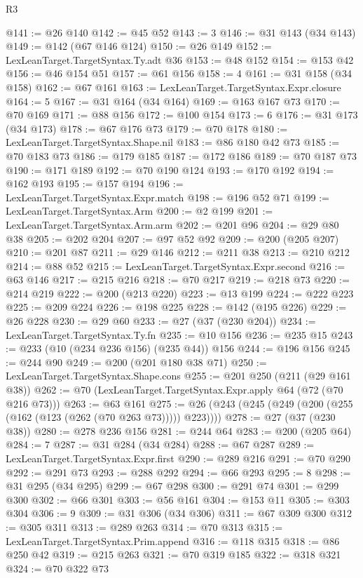 \begin{lexlean}{R3}
\begin{coremodule}
@141 := @26 @140
@142 := @45 @52
@143 := 3
@146 := @31 @143 (@34 @143)
@149 := @142 (@67 @146 @124)
@150 := @26 @149
@152 := LexLeanTarget.TargetSyntax.Ty.adt @36
@153 := @48 @152
@154 := @153 @42
@156 := @46 @154 @51
@157 := @61 @156
@158 := 4
@161 := @31 @158 (@34 @158)
@162 := @67 @161
@163 := LexLeanTarget.TargetSyntax.Expr.closure
@164 := 5
@167 := @31 @164 (@34 @164)
@169 := @163 @167 @73
@170 := @70 @169
@171 := @88 @156
@172 := @100 @154
@173 := 6
@176 := @31 @173 (@34 @173)
@178 := @67 @176 @73
@179 := @70 @178
@180 := LexLeanTarget.TargetSyntax.Shape.nil
@183 := @86 @180 @42 @73
@185 := @70 @183 @73
@186 := @179 @185
@187 := @172 @186
@189 := @70 @187 @73
@190 := @171 @189
@192 := @70 @190 @124
@193 := @170 @192
@194 := @162 @193
@195 := @157 @194
@196 := LexLeanTarget.TargetSyntax.Expr.match
@198 := @196 @52 @71
@199 := LexLeanTarget.TargetSyntax.Arm
@200 := @2 @199
@201 := LexLeanTarget.TargetSyntax.Arm.arm
@202 := @201 @96
@204 := @29 @80 @38
@205 := @202 @204
@207 := @97 @52 @92
@209 := @200 (@205 @207)
@210 := @201 @87
@211 := @29 @146
@212 := @211 @38
@213 := @210 @212
@214 := @88 @52
@215 := LexLeanTarget.TargetSyntax.Expr.second
@216 := @63 @146
@217 := @215 @216
@218 := @70 @217
@219 := @218 @73
@220 := @214 @219
@222 := @200 (@213 @220)
@223 := @13 @199
@224 := @222 @223
@225 := @209 @224
@226 := @198 @225
@228 := @142 (@195 @226)
@229 := @26 @228
@230 := @29 @60
@233 := @27 (@37 (@230 @204))
@234 := LexLeanTarget.TargetSyntax.Ty.fn
@235 := @10 @156
@236 := @235 @15
@243 := @233 (@10 (@234 @236 @156) (@235 @44)) @156
@244 := @196 @156
@245 := @244 @90
@249 := @200 (@201 @180 @38 @71)
@250 := LexLeanTarget.TargetSyntax.Shape.cons
@255 := @201 @250 (@211 (@29 @161 @38))
@262 := @70 (LexLeanTarget.TargetSyntax.Expr.apply @64 (@72 (@70 @216 @73)))
@263 := @63 @161
@275 := @26 (@243 (@245 (@249 (@200 (@255 (@162 (@123 (@262 (@70 @263 @73))))) @223))))
@278 := @27 (@37 (@230 @38))
@280 := @278 @236 @156
@281 := @244 @64
@283 := @200 (@205 @64)
@284 := 7
@287 := @31 @284 (@34 @284)
@288 := @67 @287
@289 := LexLeanTarget.TargetSyntax.Expr.first
@290 := @289 @216
@291 := @70 @290
@292 := @291 @73
@293 := @288 @292
@294 := @66 @293
@295 := 8
@298 := @31 @295 (@34 @295)
@299 := @67 @298
@300 := @291 @74
@301 := @299 @300
@302 := @66 @301
@303 := @56 @161
@304 := @153 @11
@305 := @303 @304
@306 := 9
@309 := @31 @306 (@34 @306)
@311 := @67 @309 @300
@312 := @305 @311
@313 := @289 @263
@314 := @70 @313
@315 := LexLeanTarget.TargetSyntax.Prim.append
@316 := @118 @315
@318 := @86 @250 @42
@319 := @215 @263
@321 := @70 @319 @185
@322 := @318 @321
@324 := @70 @322 @73

\end{coremodule}
\end{lexlean}
